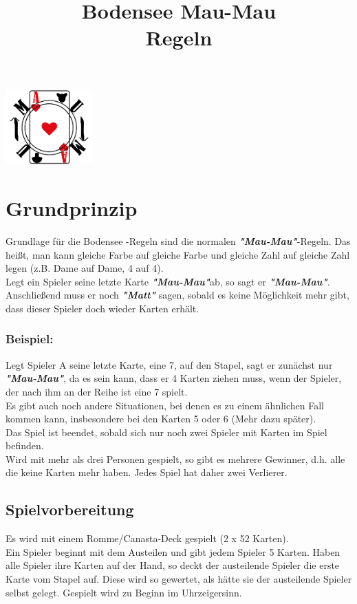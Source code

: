 \documentclass{article}
\title{Bodensee Mau-Mau \\ Regeln}
\begin{document}
\maketitle
\begin{center}
\includegraphics[width=0.25\textwidth]{photos/logo.png}
\end{center}

\section*{Grundprinzip}
Grundlage für die Bodensee -Regeln sind die normalen \textit{\textbf{"Mau-Mau"}}-Regeln. Das heißt, man kann gleiche Farbe auf gleiche Farbe und gleiche Zahl auf gleiche Zahl legen (z.B. Dame auf
Dame, 4 auf 4). \\
Legt ein Spieler seine letzte Karte \textit{\textbf{"Mau-Mau"}}ab, so sagt er \textit{\textbf{"Mau-Mau"}}. Anschließend muss er noch  \textbf{\textit{"Matt"}} sagen, sobald es keine Möglichkeit mehr gibt, dass dieser Spieler doch wieder Karten erhält.
\subsubsection*{Beispiel:}
Legt Spieler A seine letzte Karte, eine 7, auf den Stapel, sagt er zunächst nur \textit{\textbf{"Mau-Mau"}}, da es sein kann, dass er 4 Karten ziehen muss, wenn der Spieler, der nach ihm an der Reihe ist eine 7 spielt. \\
Es gibt auch noch andere Situationen, bei denen es zu einem ähnlichen Fall kommen kann, insbesondere bei den Karten 5 oder 6 (Mehr dazu später). \\
Das Spiel ist beendet, sobald sich nur noch zwei Spieler mit Karten im Spiel befinden. \\ Wird mit mehr als drei Personen gespielt, so gibt es mehrere Gewinner, d.h. alle die keine Karten mehr haben. Jedes Spiel hat daher zwei Verlierer.
\subsection*{Spielvorbereitung}
Es wird mit einem Romme/Canasta-Deck gespielt (2 x 52 Karten). \\ Ein Spieler beginnt mit dem Austeilen und gibt jedem Spieler 5 Karten. Haben alle Spieler ihre Karten auf der Hand, so deckt der austeilende Spieler die erste Karte vom Stapel auf. Diese wird so gewertet, als hätte sie der austeilende Spieler selbst gelegt. Gespielt wird zu Beginn im Uhrzeigersinn. \\
\end{document}
